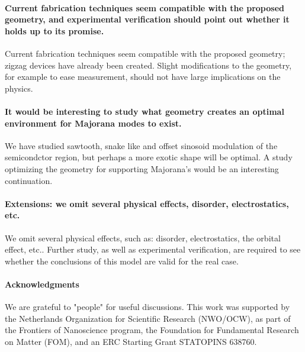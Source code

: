 \documentclass[english, twocolumn, 10pt, aps, superscriptaddress, floatfix, prb, citeautoscript]{revtex4-1}
\renewcommand{\comment}[2]{#2}
\renewcommand{\comment}{\paragraph}
\begin{document}
\comment{Current fabrication techniques seem compatible with the proposed geometry, and experimental verification should point out whether it holds up to its promise.}
Current fabrication techniques seem compatible with the proposed geometry; zigzag devices have already been created.
Slight modifications to the geometry, for example to ease measurement, should not have large implications on the physics.

\comment{It would be interesting to study what geometry creates an optimal environment for Majorana modes to exist.}
We have studied sawtooth, snake like and offset sinosoid modulation of the semicondctor region, but perhaps a more exotic shape will be optimal.
A study optimizing the geometry for supporting Majorana's would be an interesting continuation.

\comment{Extensions: we omit several physical effects, disorder, electrostatics, etc.}
We omit several physical effects, such as: disorder, electrostatics, the orbital effect, etc..
Further study, as well as experimental verification, are required to see whether the conclusions of this model are valid for the real case.

\comment{Acknowledgments}

We are grateful to "people" for useful discussions.
This work was supported by the Netherlands Organization for Scientific Research (NWO/OCW), as part of the Frontiers of Nanoscience program, the Foundation for Fundamental Research on Matter (FOM), and an ERC Starting Grant STATOPINS 638760.



\end{document}
